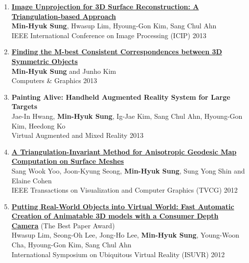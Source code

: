 \documentclass[letterpaper,10pt]{article} %
\newcommand{\blankline}{\quad\pagebreak[2]}
\begin{document}
{{\begin{enumerate}
\item \label{icip13}
\href{http://dx.doi.org/10.1109/icip.2013.6738034}{\textbf{Image Unprojection for 3D Surface Reconstruction: A Triangulation-based Approach}}\\
\textbf{Min-Hyuk Sung}, Hwasup Lim, Hyoung-Gon Kim, Sang Chul Ahn\\
IEEE International Conference on Image Processing (ICIP) 2013\\
\blankline

\item \label{cg13}
\href{http://dx.doi.org/10.1016/j.cag.2012.11.002}{\textbf{Finding the M-best Consistent Correspondences between 3D Symmetric Objects}} \\
\textbf{Min-Hyuk Sung} and Junho Kim\\
Computers \& Graphics 2013\\
\blankline

\item \label{vamr13}
\textbf{Painting Alive: Handheld Augmented Reality System for Large Targets} \\
Jae-In Hwang, \textbf{Min-Hyuk Sung}, Ig-Jae Kim, Sang Chul Ahn, Hyoung-Gon Kim, Heedong Ko\\
Virtual Augmented and Mixed Reality 2013\\
\blankline

\item \label{tvcg12}
\href{http://dx.doi.org/10.1109/TVCG.2012.29}{\textbf{A Triangulation-Invariant Method for Anisotropic Geodesic Map Computation on Surface Meshes}} \\
Sang Wook Yoo, Joon-Kyung Seong, \textbf{Min-Hyuk Sung}, Sung Yong Shin and Elaine Cohen\\
IEEE Transactions on Visualization and Computer Graphics (TVCG) 2012\\
\blankline

\item \label{isuvr12}
\href{http://dx.doi.org/10.1109/ISUVR.2012.12}{\textbf{Putting Real-World Objects into Virtual World: Fast Automatic Creation of Animatable 3D models with a Consumer Depth Camera}} (The Best Paper Award)\\
Hwasup Lim, Seong-Oh Lee, Jong-Ho Lee, \textbf{Min-Hyuk Sung}, Young-Woon Cha, Hyoung-Gon Kim, Sang Chul Ahn \\
International Symposium on Ubiquitous Virtual Reality (ISUVR) 2012\\
\blankline


\end{enumerate}}}
\end{document}
